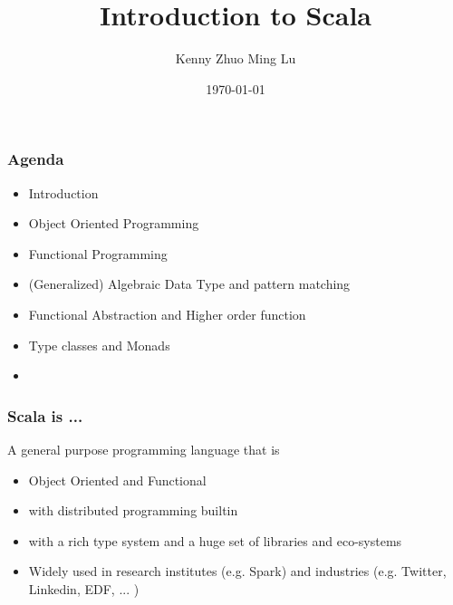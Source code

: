 \documentclass{beamer}
\begin{document}
\title{Introduction to Scala} 
\author{
 Kenny Zhuo Ming Lu
}
\date{\today} 


\frame{\titlepage} 

%
\begin{frame}[fragile]
\frametitle{Agenda}
\begin{itemize}
 \item Introduction
 \item Object Oriented Programming 
 \item Functional Programming 
 \item (Generalized) Algebraic Data Type and pattern matching
 \item Functional Abstraction and Higher order function
 \item Type classes and Monads
 \item 
\end{itemize}
\end{frame}

\begin{frame}[fragile]
\frametitle{Scala is ... }

A general purpose programming language that is 
\begin{itemize}
 \item Object Oriented and Functional
 \item with distributed programming builtin
 \item with a rich type system and a huge set of libraries and eco-systems
 \item Widely used in research institutes (e.g. Spark) and industries
   (e.g. Twitter, Linkedin, EDF, ... )
\end{itemize}
\end{frame}
\end{document}
